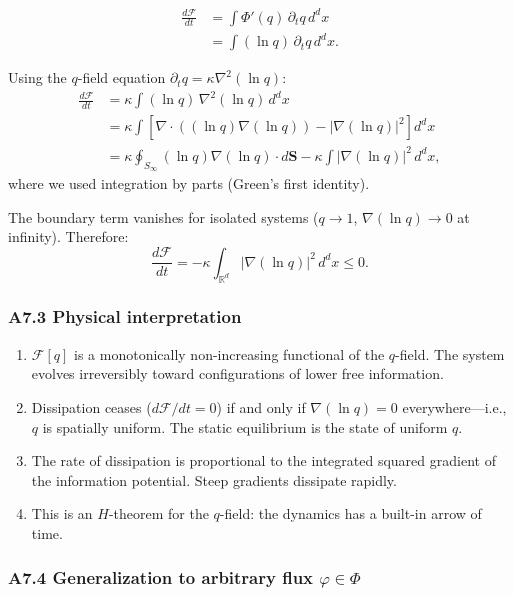 \documentclass[reprint]{revtex4-2}
\begin{document}
\begin{align}
\frac{d\mathcal{F}}{dt} &= \int \Phi'(q)\,\partial_t q\,d^d x\\
&= \int (\ln q)\,\partial_t q\,d^d x.
\end{align}

Using the $q$-field equation $\partial_t q = \kappa\nabla^2(\ln q)$:
\begin{align}
\frac{d\mathcal{F}}{dt} &= \kappa\int (\ln q)\,\nabla^2(\ln q)\,d^d x\\
&= \kappa\int \left[\nabla\cdot((\ln q)\nabla(\ln q)) - |\nabla(\ln q)|^2\right] d^d x\\
&= \kappa\oint_{S_\infty} (\ln q)\nabla(\ln q)\cdot d\mathbf{S} - \kappa\int |\nabla(\ln q)|^2\,d^d x,
\end{align}
where we used integration by parts (Green's first identity).

The boundary term vanishes for isolated systems ($q\to 1$, $\nabla(\ln q)\to 0$ at infinity). Therefore:
\begin{equation}
\boxed{\frac{d\mathcal{F}}{dt} = -\kappa\int_{\mathbb{R}^d} |\nabla(\ln q)|^2\,d^d x \le 0}.
\label{eq:dissipation}
\end{equation}

\subsubsection{A7.3 Physical interpretation}

\begin{enumerate}[label=(\roman*)]
\item $\mathcal{F}[q]$ is a monotonically non-increasing functional of the $q$-field. The system evolves irreversibly toward configurations of lower free information.
\item Dissipation ceases ($d\mathcal{F}/dt = 0$) if and only if $\nabla(\ln q)=0$ everywhere---i.e., $q$ is spatially uniform. The static equilibrium is the state of uniform $q$.
\item The rate of dissipation is proportional to the integrated squared gradient of the information potential. Steep gradients dissipate rapidly.
\item This is an $H$-theorem for the $q$-field: the dynamics has a built-in arrow of time.
\end{enumerate}

\subsubsection{A7.4 Generalization to arbitrary flux $\varphi \in \Phi$}
\end{document}
